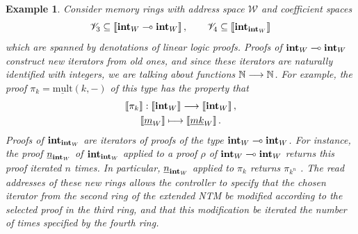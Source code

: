 \documentclass[english,letter paper,12pt,leqno]{article}
\theoremstyle{example}
\newtheorem{example}[theorem]{Example}
\numberwithin{equation}{section}
\begin{document}
\begin{example}\label{example:ntm_super} Consider memory rings with address space $\mathscr{W}$ and coefficient spaces
\[
\mathscr{V}_3 \subseteq \llbracket  \textbf{int}_{W} \multimap \textbf{int}_W  \rrbracket\,, \qquad \mathscr{V}_4 \subseteq \llbracket  \textbf{int}_{\textbf{int}_W}  \rrbracket
\]
which are spanned by denotations of linear logic proofs. Proofs of $\textbf{int}_W \multimap \textbf{int}_W$ construct new iterators from old ones, and since these iterators are naturally identified with integers, we are talking about functions $\mathbb{N} \longrightarrow \mathbb{N}$. For example, the proof $\pi_k = \underline{\mathrm{mult}}(k,-)$ of this type \cite[\S 6.1]{murfet_ll} has the property that
\begin{gather*}
\llbracket \pi_k \rrbracket: \llbracket \textbf{int}_W \rrbracket \longrightarrow \llbracket \textbf{int}_W \rrbracket\,,\\
\llbracket \underline{m}_W \rrbracket \longmapsto \llbracket \underline{mk}_W \rrbracket\,.
\end{gather*}
Proofs of $\textbf{int}_{\textbf{int}_W}$ are iterators of proofs of the type $\textbf{int}_W \multimap \textbf{int}_W$. For instance, the proof $\underline{n}_{\textbf{int}_W}$ of $\textbf{int}_{\textbf{int}_W}$ applied to a proof $\rho$ of $\textbf{int}_W \multimap \textbf{int}_W$ returns this proof iterated $n$ times. In particular, $\underline{n}_{\textbf{int}_W}$ applied to $\pi_k$ returns $\pi_{k^n}$ \cite[Example 7.4]{murfet_ll}. The read addresses of these new rings allows the controller to specify that the chosen iterator from the second ring of the extended NTM be modified according to the selected proof in the third ring, and that this modification be iterated the number of times specified by the fourth ring.


\end{example}
\end{document}
